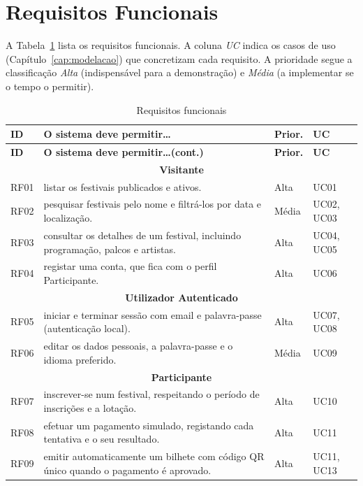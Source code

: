 \section{Requisitos Funcionais}

A Tabela~\ref{tab:rf} lista os requisitos funcionais. A coluna \emph{UC}
indica os casos de uso (Capítulo~\ref{cap:modelacao}) que concretizam cada
requisito. A prioridade segue a classificação \emph{Alta} (indispensável para
a demonstração) e \emph{Média} (a implementar se o tempo o permitir).

\begin{longtable}{|l|p{8.6cm}|l|l|}
\caption{Requisitos funcionais}\label{tab:rf}\\
\hline
\textbf{ID} & \textbf{O sistema deve permitir\dots} & \textbf{Prior.} & \textbf{UC} \\ \hline
\endfirsthead
\hline
\textbf{ID} & \textbf{O sistema deve permitir\dots (cont.)} & \textbf{Prior.} & \textbf{UC} \\ \hline
\endhead
\multicolumn{4}{c}{\textbf{Visitante}} \\ \hline
RF01 & listar os festivais publicados e ativos. & Alta & UC01 \\ \hline
RF02 & pesquisar festivais pelo nome e filtrá-los por data e localização. & Média & UC02, UC03 \\ \hline
RF03 & consultar os detalhes de um festival, incluindo programação, palcos e artistas. & Alta & UC04, UC05 \\ \hline
RF04 & registar uma conta, que fica com o perfil Participante. & Alta & UC06 \\ \hline
\multicolumn{4}{c}{\textbf{Utilizador Autenticado}} \\ \hline
RF05 & iniciar e terminar sessão com email e palavra-passe (autenticação local). & Alta & UC07, UC08 \\ \hline
RF06 & editar os dados pessoais, a palavra-passe e o idioma preferido. & Média & UC09 \\ \hline
\multicolumn{4}{c}{\textbf{Participante}} \\ \hline
RF07 & inscrever-se num festival, respeitando o período de inscrições e a lotação. & Alta & UC10 \\ \hline
RF08 & efetuar um pagamento simulado, registando cada tentativa e o seu resultado. & Alta & UC11 \\ \hline
RF09 & emitir automaticamente um bilhete com código QR único quando o pagamento é aprovado. & Alta & UC11, UC13 \\ \hline

\end{longtable}

